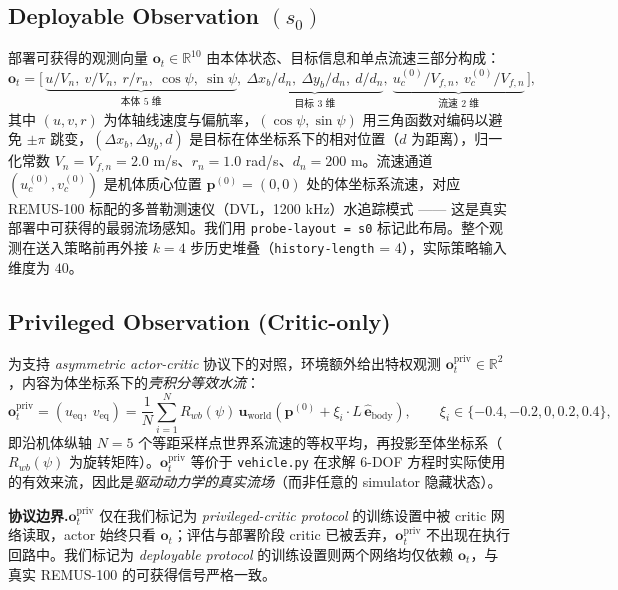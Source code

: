 \subsection{Deployable Observation $(s_0)$}\label{subsec:setup_obs_deployable}

部署可获得的观测向量 $\mathbf{o}_t \in \mathbb{R}^{10}$ 由本体状态、目标信息和单点流速三部分构成：
\begin{equation}
\mathbf{o}_t = \bigl[\,\underbrace{u/V_n,\ v/V_n,\ r/r_n,\ \cos\psi,\ \sin\psi}_{\text{本体 5 维}},\ \underbrace{\Delta x_b/d_n,\ \Delta y_b/d_n,\ d/d_n}_{\text{目标 3 维}},\ \underbrace{u_c^{(0)}/V_{f,n},\ v_c^{(0)}/V_{f,n}}_{\text{流速 2 维}}\,\bigr],
\end{equation}
其中 $(u, v, r)$ 为体轴线速度与偏航率，$(\cos\psi, \sin\psi)$ 用三角函数对编码以避免 $\pm\pi$ 跳变，$(\Delta x_b, \Delta y_b, d)$ 是目标在体坐标系下的相对位置（$d$ 为距离），归一化常数 $V_n = V_{f,n} = 2.0$ m/s、$r_n = 1.0$ rad/s、$d_n = 200$ m。流速通道 $(u_c^{(0)}, v_c^{(0)})$ 是机体质心位置 $\mathbf{p}^{(0)} = (0, 0)$ 处的体坐标系流速，对应 REMUS-100 标配的多普勒测速仪（DVL，1200 kHz）水追踪模式 —— 这是真实部署中可获得的最弱流场感知。我们用 \texttt{probe-layout = s0} 标记此布局。整个观测在送入策略前再外接 $k = 4$ 步历史堆叠（\texttt{history-length} = 4），实际策略输入维度为 $40$。

\subsection{Privileged Observation (Critic-only)}\label{subsec:setup_obs_privileged}

为支持 \emph{asymmetric actor-critic} \citep{pinto2017asymmetric} 协议下的对照，环境额外给出特权观测 $\mathbf{o}_t^{\mathrm{priv}} \in \mathbb{R}^2$，内容为体坐标系下的\emph{壳积分等效水流}：
\begin{equation}
\mathbf{o}_t^{\mathrm{priv}} = (u_{\mathrm{eq}},\ v_{\mathrm{eq}}) = \frac{1}{N}\sum_{i=1}^{N} R_{wb}(\psi)\,\mathbf{u}_{\mathrm{world}}\!\left(\mathbf{p}^{(0)} + \xi_i \cdot L\,\hat{\mathbf{e}}_{\mathrm{body}}\right),\qquad \xi_i \in \{-0.4, -0.2, 0, 0.2, 0.4\},
\label{eq:setup_priv_obs}
\end{equation}
即沿机体纵轴 $N = 5$ 个等距采样点世界系流速的等权平均，再投影至体坐标系（$R_{wb}(\psi)$ 为旋转矩阵）。$\mathbf{o}_t^{\mathrm{priv}}$ 等价于 \texttt{vehicle.py} 在求解 6-DOF 方程时实际使用的有效来流，因此是\emph{驱动动力学的真实流场}（而非任意的 simulator 隐藏状态）。

\textbf{协议边界.}\quad $\mathbf{o}_t^{\mathrm{priv}}$ 仅在我们标记为 \emph{privileged-critic protocol} 的训练设置中被 critic 网络读取，actor 始终只看 $\mathbf{o}_t$；评估与部署阶段 critic 已被丢弃，$\mathbf{o}_t^{\mathrm{priv}}$ 不出现在执行回路中。我们标记为 \emph{deployable protocol} 的训练设置则两个网络均仅依赖 $\mathbf{o}_t$，与真实 REMUS-100 的可获得信号严格一致。


